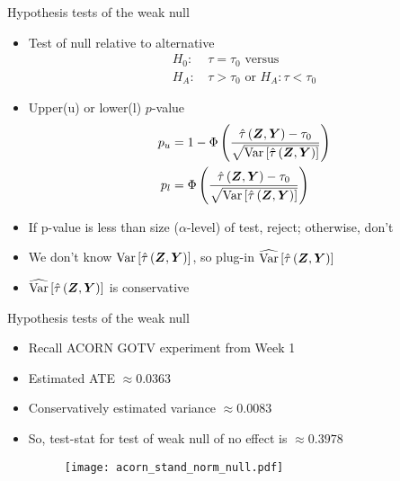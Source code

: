 \documentclass[table, xcolor = {dvipsnames}, 9pt]{beamer}
\theoremstyle{plain}
\DeclareMathOperator{\Var}{\rm{Var}}
\begin{document}
\begin{frame}{Hypothesis tests of the weak null} \vfill
\begin{itemize} \vfill
\item Test of null relative to alternative \vfill
\begin{align*}
H_0: & \, \tau = \tau_0 \text{ versus } \\
H_A: & \, \tau > \tau_0 \text{ or } H_A: \tau < \tau_0
\end{align*} \vfill
\item Upper(u) or lower(l) $p$-value \vfill
\begin{align*}
p_u & =  1 - \Phi\left(\frac{\hat{\tau}\left(\bm{Z}, \bm{Y}\right) - \tau_0}{\sqrt{\Var\left[\hat{\tau}\left(\bm{Z}, \bm{Y}\right)\right]}}\right) \\
p_l & =  \Phi\left(\frac{\hat{\tau}\left(\bm{Z}, \bm{Y}\right) - \tau_0}{\sqrt{\Var\left[\hat{\tau}\left(\bm{Z}, \bm{Y}\right)\right]}}\right)
\end{align*} \vfill
\item If p-value is less than size ($\alpha$-level) of test, reject; otherwise, don't \vfill
\item We don't know $\Var\left[\hat{\tau}\left(\bm{Z}, \bm{Y}\right)\right]$, so plug-in $\widehat{\Var}\left[\hat{\tau}\left(\bm{Z}, \bm{Y}\right)\right]$ \vfill
\item[] $\widehat{\Var}\left[\hat{\tau}\left(\bm{Z}, \bm{Y}\right)\right]$ is conservative \vfill
\end{itemize} \vfill
\end{frame}
\begin{frame}{Hypothesis tests of the weak null} \vfill
\begin{itemize} \vfill
\item Recall ACORN GOTV experiment \citep{arceneaux2005} from Week 1 \vfill
\item Estimated ATE $\approx 0.0363$ \vfill
\item Conservatively estimated variance $\approx 0.0083$ \vfill
\item So, test-stat for test of weak null of no effect is $\approx 0.3978$ \vfill
\vspace{1em}
\begin{figure}
\texttt{[image: acorn\_stand\_norm\_null.pdf]}
\end{figure} \vfill
\end{itemize} \vfill
\end{frame}
\end{document}
